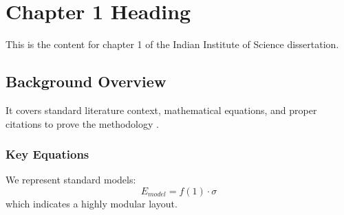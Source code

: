 \chapter{Chapter 1 Heading}
\label{ch:chapter1}
This is the content for chapter 1 of the Indian Institute of Science dissertation.

\section{Background Overview}
It covers standard literature context, mathematical equations, and proper citations to prove the methodology \cite{texbook}.

\subsection{Key Equations}
We represent standard models:
\begin{equation}
    E_{model} = f(1) \cdot \sigma
\end{equation}
which indicates a highly modular layout.
